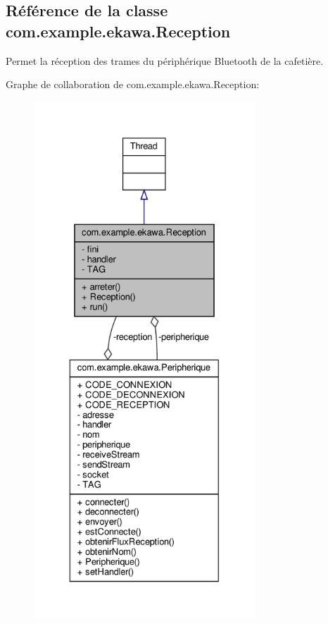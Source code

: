 \hypertarget{classcom_1_1example_1_1ekawa_1_1_reception}{}\subsection{Référence de la classe com.\+example.\+ekawa.\+Reception}
\label{classcom_1_1example_1_1ekawa_1_1_reception}


Permet la réception des trames du périphérique Bluetooth de la cafetière.  




Graphe de collaboration de com.\+example.\+ekawa.\+Reception\+:\nopagebreak
\begin{figure}[H]
\begin{center}
\leavevmode
\includegraphics[height=550pt]{classcom_1_1example_1_1ekawa_1_1_reception__coll__graph}
\end{center}
\end{figure}

